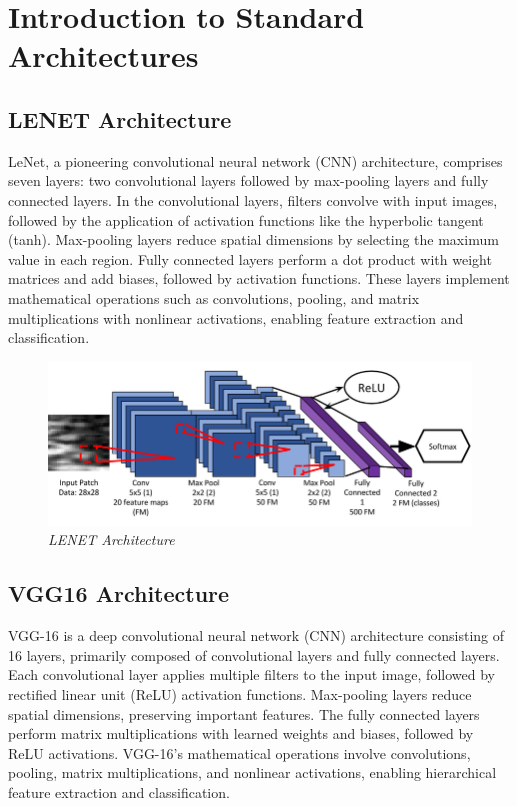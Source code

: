 \documentclass[12pt, a4paper]{report}
\begin{document}
\section{Introduction to Standard Architectures}
\subsection{LENET Architecture}
LeNet, a pioneering convolutional neural network (CNN) architecture, comprises seven layers: two convolutional layers followed by max-pooling layers and fully connected layers. In the convolutional layers, filters convolve with input images, followed by the application of activation functions like the hyperbolic tangent (tanh). Max-pooling layers reduce spatial dimensions by selecting the maximum value in each region. Fully connected layers perform a dot product with weight matrices and add biases, followed by activation functions. These layers implement mathematical operations such as convolutions, pooling, and matrix multiplications with nonlinear activations, enabling feature extraction and classification.

\begin{figure}[htbp]
    \includegraphics[width=1\textwidth]{report images/image4.png}
    \caption[LENET Architecture]{\textit{LENET Architecture}}
\end{figure}

\subsection{VGG16 Architecture}
VGG-16 is a deep convolutional neural network (CNN) architecture consisting of 16 layers, primarily composed of convolutional layers and fully connected layers. Each convolutional layer applies multiple filters to the input image, followed by rectified linear unit (ReLU) activation functions. Max-pooling layers reduce spatial dimensions, preserving important features. The fully connected layers perform matrix multiplications with learned weights and biases, followed by ReLU activations. VGG-16's mathematical operations involve
convolutions, pooling, matrix multiplications, and nonlinear activations, enabling hierarchical feature extraction and classification.
\end{document}
